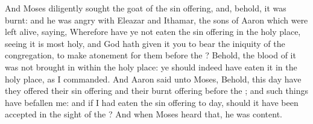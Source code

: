 \begin{biblechapter}
\verse And Moses diligently sought the goat of the sin offering, and, behold, it was burnt: and he was angry with Eleazar and Ithamar, the sons of Aaron which were left alive, saying,
\verse Wherefore have ye not eaten the sin offering in the holy place, seeing it is most holy, and God hath given it you to bear the iniquity of the congregation, to make atonement for them before the \LORD?
\verse Behold, the blood of it was not brought in within the holy place: ye should indeed have eaten it in the holy place, as I commanded.
\verse And Aaron said unto Moses, Behold, this day have they offered their sin offering and their burnt offering before the \LORD; and such things have befallen me: and if I had eaten the sin offering to day, should it have been accepted in the sight of the \LORD?
\verse And when Moses heard that, he was content.
\end{biblechapter}

